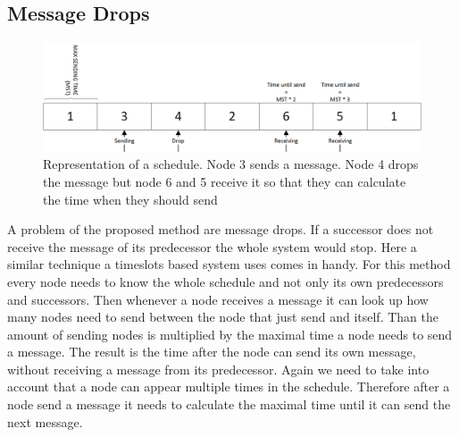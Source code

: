 \subsection{Message Drops}
\label{chp:apr_samplingDrops}
\begin{figure} [htbp]
	\centering         
    \includegraphics[scale=0.6]{content/images/MessageDrop}
    \caption{Representation of a schedule. Node 3 sends a message. Node 4 drops the message but node 6 and 5 receive it so that they can calculate the time when they should send}
    \label{fig:msgDrop}
\end{figure}
A problem of the proposed method are message drops. If a successor does not receive the message of its predecessor the whole system would stop. Here a similar technique a timeslots based system uses comes in handy. For this method every node needs to know the whole schedule and not only its own predecessors and successors. Then whenever a node receives a message it can look up how many nodes need to send between the node that just send and itself. Than the amount of sending nodes is multiplied by the maximal time a node needs to send a message. The result is the time after the node can send its own message, without receiving a message from its predecessor. Again we need to take into account that a node can appear multiple times in the schedule. Therefore after a node send a message it needs to calculate the maximal time until it can send the next message.
